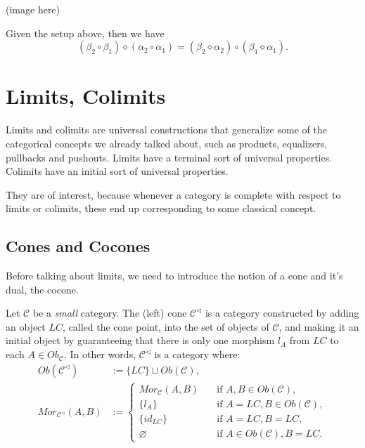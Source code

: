 \begin{theorem}
	(image here)

	Given the setup above, then we have
	\begin{displaymath}
		(\beta_2 \circ \beta_1) \diamond (\alpha_2 \circ \alpha_1) =
		(\beta_2 \diamond \alpha_2) \circ (\beta_1 \diamond \alpha_1).
	\end{displaymath}

\end{theorem}

\newpage
\section{Limits, Colimits}

Limits and colimits are universal constructions that generalize some of the
categorical concepts we already talked about, such as products,
equalizers, pullbacks and pushouts.
Limits have a terminal sort of universal properties.
Colimits have an initial sort of universal properties.

They are of interest, because whenever a category is complete with
respect to limits or colimits, these end up corresponding to some
classical concept.

\subsection{Cones and Cocones}

Before talking about limits, we need to introduce the notion of a cone and it's dual, the cocone.

\begin{definition}[Cone]
	Let $\mathcal C$ be a \textit{small} category. The (left) cone $\mathcal C^{\lhd}$ is a category constructed
	by adding an object $LC$, called the cone point, into the set of objects of $\mathcal C$,
	and making it an initial object by guaranteeing that there is only one morphism $l_A$ from $LC$ to each
	$A \in Ob_\mathcal C$. In other words, $\mathcal C^{\lhd}$ is a category where:
	\begin{align*}
		Ob(\mathcal C^{\lhd})        & := \{LC\} \sqcup Ob(\mathcal C), \\
		Mor_{\mathcal C^{\lhd}}(A,B) & :=
		\begin{cases}
			Mor_\mathcal C (A,B)  \quad & \text{if } A,B \in Ob(\mathcal C),       \\
			\{l_A\}  \quad              & \text{if } A = LC, B \in Ob(\mathcal C), \\
			\{id_{LC}\}  \quad          & \text{if } A = LC, B = LC,               \\
			\varnothing \quad           & \text{if } A \in Ob(\mathcal C), B = LC.
		\end{cases}
	\end{align*}
\end{definition}

